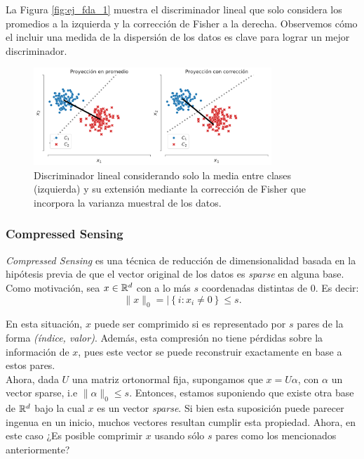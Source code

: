 La Figura \ref{fig:ej_fda_1} muestra el  discriminador lineal que solo considera los promedios a la  izquierda y la corrección de Fisher a la derecha. Observemos cómo el incluir una medida de la dispersión de los datos es clave para lograr un mejor discriminador.

\begin{figure}[H]
	\centering
	\includegraphics[width=0.8\textwidth]{img/cap6_dos_clases_proyeccion.pdf}
	\caption{Discriminador lineal considerando solo la media entre clases (izquierda) y  su extensión mediante la corrección de Fisher que incorpora la varianza muestral de los datos.}
	\label{fig:ej_fda_3}
\end{figure}

\subsubsection{Compressed Sensing }

\textit{Compressed Sensing} es una técnica de reducción de dimensionalidad basada en la hipótesis previa de que el vector original de los datos es \textit{sparse} en alguna base. \\

Como motivación, sea $x \in \mathbb{R}^d$ con a lo más $s$ coordenadas distintas de $0$. Es decir: 
$$
\| x \|_0 = | \left \{i: x_i \not = 0 \right \} \leq s.
$$

En esta situación, $x$ puede ser comprimido si es representado por $s$ pares de la forma \textit{(índice, valor)}. Además, esta compresión no tiene pérdidas sobre la información de $x$, pues este vector se puede reconstruir exactamente en base a estos pares.\\ 

Ahora, dada $U$ una matriz ortonormal fija, supongamos que $x = U \alpha$, con $\alpha$ un vector sparse, i.e $\| \alpha \|_0 \leq s$. Entonces, estamos suponiendo que existe otra base de $\mathbb{R}^d$ bajo la cual $x$ es un vector \textit{sparse}. Si bien esta suposición puede parecer ingenua en un inicio, muchos vectores resultan cumplir esta propiedad. Ahora, en este caso ¿Es posible comprimir $x$ usando sólo $s$ pares como los mencionados anteriormente? \\

